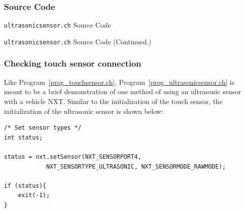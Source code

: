 \documentclass[11pt]{article}
\begin{document}
\subsubsection*{Source Code}

\begin{Program}[H]
    {\small}
    \caption{\texttt{ultrasonicsensor.ch} Source Code\label{prog_ultrasonicsensor.ch}}
\end{Program}
\addtocounter{Program}{-1}
\begin{Program}[H]
    {\small}
    \caption{\texttt{ultrasonicsensor.ch} Source Code (Continued.)\label{prog_ultrasonicsensor.ch}}
\end{Program}

\subsubsection*{Checking touch sensor connection}
Like Program~\ref{prog_touchsensor.ch}, Program~\ref{prog_ultrasonicsensor.ch} is meant to be a 
brief demonstration of one method of using an ultrasonic sensor with a vehicle NXT. Similar to the 
initialization of the touch sensor, the initialization of the ultrasonic sensor is shown below:
\begin{verbatim}
/* Set sensor types */
int status;

status = nxt.setSensor(NXT_SENSORPORT4, 
            NXT_SENSORTYPE_ULTRASONIC, NXT_SENSORMODE_RAWMODE);

if (status){
    exit(-1);
}
\end{verbatim}
\end{document}
